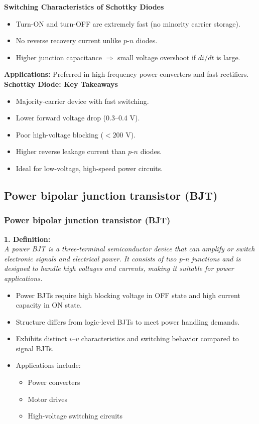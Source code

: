 \begin{frame}{\textbf{Switching Characteristics of Schottky Diodes}}
    \begin{itemize}
        \item Turn-ON and turn-OFF are extremely fast (no minority carrier storage).
        \item No reverse recovery current unlike $p$-$n$ diodes.
        \item Higher junction capacitance $\Rightarrow$ small voltage overshoot if $di/dt$ is large.
    \end{itemize}
    
    \textbf{Applications:} Preferred in high-frequency power converters and fast rectifiers. \\
    \textbf{Schottky Diode: Key Takeaways}
    \begin{itemize}
        \item Majority-carrier device with fast switching.
        \item Lower forward voltage drop (0.3–0.4 V).
        \item Poor high-voltage blocking ($<200$ V).
        \item Higher reverse leakage current than $p$-$n$ diodes.
        \item Ideal for low-voltage, high-speed power circuits.
    \end{itemize}
\end{frame}
    


\subsection{Power bipolar junction transistor (BJT)}

\begin{frame}
    \frametitle{Power bipolar junction transistor (BJT)}
    \textbf{1. Definition:} \\
    \textit{A power BJT is a three-terminal semiconductor device that can amplify or switch electronic signals and electrical power. It consists of two p-n junctions and is designed to handle high voltages and currents, making it suitable for power applications.}
\begin{itemize}
    \item Power BJTs require high blocking voltage in OFF state and high current capacity in ON state.
    \item Structure differs from logic-level BJTs to meet power handling demands.
    \item Exhibits distinct $i$–$v$ characteristics and switching behavior compared to signal BJTs.
    \item Applications include:
    \begin{itemize}
        \item Power converters
        \item Motor drives
        \item High-voltage switching circuits
    \end{itemize}
\end{itemize}
\end{frame}

